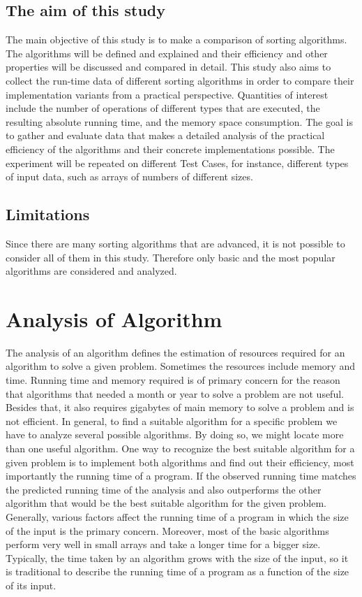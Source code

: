 \documentclass{article}
\begin{document}
\subsection{The aim of this study}
The main objective of this study is to make a comparison  of sorting algorithms. The algorithms will be
defined and explained and their efficiency and other properties will be discussed and
compared in detail.
This study also aims to collect the run-time data of different sorting algorithms
in order to compare their implementation variants from a practical perspective.
Quantities of interest include the number of operations of different types that are
executed, the resulting absolute running time, and the memory space consumption.
The goal is to gather and evaluate data that makes a detailed analysis of the practical efficiency of the algorithms and their concrete implementations possible. The experiment will be
repeated on different Test Cases, for instance, different types of input data, such as
arrays of numbers of different sizes.\cite{karunanithi2014survey}

\subsection{Limitations}
Since there are many sorting algorithms that are advanced, it is not possible to consider
all of them in this study. Therefore only basic and the most popular algorithms are
considered and analyzed.\cite{karunanithi2014survey}


\section{ Analysis of Algorithm}

The analysis of an algorithm defines the estimation of resources required for an
algorithm to solve a given problem. Sometimes the resources include memory and time. Running time and memory required is of
primary concern for the reason that algorithms that needed a month or year to solve
a problem are not useful. Besides that, it also requires gigabytes of main memory to
solve a problem and is not efficient.
In general, to find a suitable algorithm for a
specific problem we have to analyze several possible algorithms. By doing so, we
might locate more than one useful algorithm. One way to recognize the best suitable
algorithm for a given problem is to implement both algorithms and find out their
efficiency, most importantly the running time of a program. If the observed running
time matches the predicted running time of the analysis and also outperforms the
other algorithm that would be the best suitable algorithm for the given problem.
Generally, various factors affect the running time of a program in which the size of
the input is the primary concern. Moreover, most of the basic algorithms perform very
well in small arrays and take a longer time for a bigger size. Typically, the time taken
by an algorithm grows with the size of the input, so it is traditional to describe the
running time of a program as a function of the size of its input. \cite{karunanithi2014survey}
\end{document}

